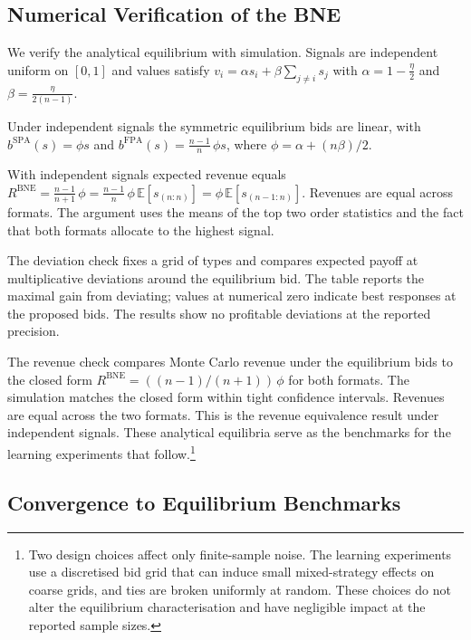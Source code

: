 \subsection{Numerical Verification of the BNE}

We verify the analytical equilibrium with simulation. Signals are independent uniform on $[0,1]$ and values satisfy $v_i = \alpha s_i + \beta\sum_{j\ne i} s_j$ with $\alpha=1-\tfrac{\eta}{2}$ and $\beta=\tfrac{\eta}{2(n-1)}$.

Under independent signals the symmetric equilibrium bids are linear, with $b^{\mathrm{SPA}}(s) = \phi s$ and $b^{\mathrm{FPA}}(s) = \tfrac{n-1}{n}\,\phi s$, where $\phi = \alpha + (n\beta)/2$.

With independent signals expected revenue equals $R^{\mathrm{BNE}} = \tfrac{n-1}{n+1}\,\phi = \tfrac{n-1}{n}\,\phi\,\mathbb{E}[s_{(n:n)}] = \phi\,\mathbb{E}[s_{(n-1:n)}]$. Revenues are equal across formats. The argument uses the means of the top two order statistics and the fact that both formats allocate to the highest signal.

The deviation check fixes a grid of types and compares expected payoff at multiplicative deviations around the equilibrium bid. The table reports the maximal gain from deviating; values at numerical zero indicate best responses at the proposed bids. The results show no profitable deviations at the reported precision.



The revenue check compares Monte Carlo revenue under the equilibrium bids to the closed form $R^{\mathrm{BNE}} = ((n-1)/(n+1))\,\phi$ for both formats. The simulation matches the closed form within tight confidence intervals. Revenues are equal across the two formats. This is the revenue equivalence result under independent signals. These analytical equilibria serve as the benchmarks for the learning experiments that follow.\footnote{Two design choices affect only finite-sample noise. The learning experiments use a discretised bid grid that can induce small mixed-strategy effects on coarse grids, and ties are broken uniformly at random. These choices do not alter the equilibrium characterisation and have negligible impact at the reported sample sizes.}



\subsection{Convergence to Equilibrium Benchmarks}
\label{sec:bne_convergence}

